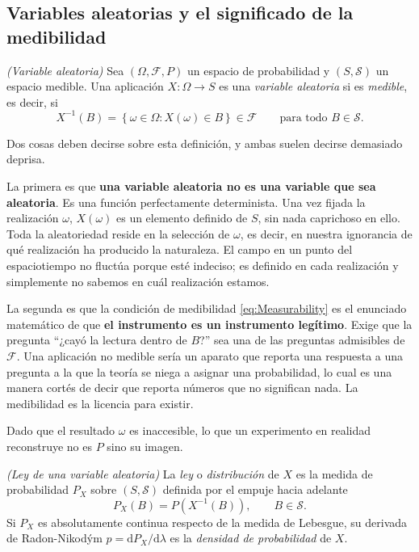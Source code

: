 	\subsection{Variables aleatorias y el significado de la medibilidad}

		\begin{myDef}
			\textit{(Variable aleatoria)} Sea $(\Omega,\mathcal{F},P)$ un espacio de probabilidad y $(S,\mathcal{S})$ un espacio medible. Una aplicación $X:\Omega\to S$ es una \textit{variable aleatoria} si es \textit{medible}, es decir, si
			\begin{equation}\label{eq:Measurability}
				X^{-1}(B) = \left\{\omega\in\Omega : X(\omega)\in B\right\}\in\mathcal{F}
				\qquad\text{para todo } B\in\mathcal{S}.
			\end{equation}
		\end{myDef}

		Dos cosas deben decirse sobre esta definición, y ambas suelen decirse demasiado deprisa.

		La primera es que \textbf{una variable aleatoria no es una variable que sea aleatoria}. Es una función perfectamente determinista. Una vez fijada la realización $\omega$, $X(\omega)$ es un elemento definido de $S$, sin nada caprichoso en ello. Toda la aleatoriedad reside en la selección de $\omega$, es decir, en nuestra ignorancia de qué realización ha producido la naturaleza. El campo en un punto del espaciotiempo no fluctúa porque esté indeciso; es definido en cada realización y simplemente no sabemos en cuál realización estamos.

		La segunda es que la condición de medibilidad \eqref{eq:Measurability} es el enunciado matemático de que \textbf{el instrumento es un instrumento legítimo}. Exige que la pregunta ``¿cayó la lectura dentro de $B$?'' sea una de las preguntas admisibles de $\mathcal{F}$. Una aplicación no medible sería un aparato que reporta una respuesta a una pregunta a la que la teoría se niega a asignar una probabilidad, lo cual es una manera cortés de decir que reporta números que no significan nada. La medibilidad es la licencia para existir.

		Dado que el resultado $\omega$ es inaccesible, lo que un experimento en realidad reconstruye no es $P$ sino su imagen.

		\begin{myDef}
			\textit{(Ley de una variable aleatoria)} La \textit{ley} o \textit{distribución} de $X$ es la medida de probabilidad $P_{X}$ sobre $(S,\mathcal{S})$ definida por el empuje hacia adelante
			\begin{equation}\label{eq:PushForward}
				P_{X}(B) = P\left(X^{-1}(B)\right), \qquad B\in\mathcal{S}.
			\end{equation}
			Si $P_{X}$ es absolutamente continua respecto de la medida de Lebesgue, su derivada de Radon-Nikodým $p = \mathrm{d}P_{X}/\mathrm{d}\lambda$ es la \textit{densidad de probabilidad} de $X$.
		\end{myDef}

